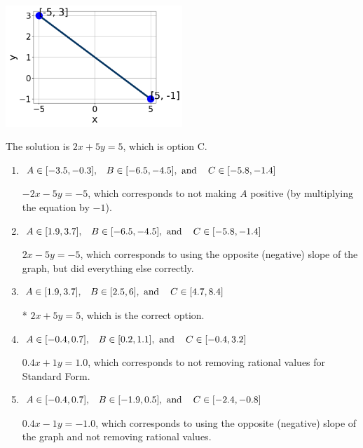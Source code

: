 \documentclass{extbook}[14pt]
\begin{document}
\begin{enumerate}
{\begin{center}
    \includegraphics[width=0.5\textwidth]{../Figures/linearGraphToStandardCopyC.png}
\end{center}


The solution is \( 2x + 5y = 5 \), which is option C.\begin{enumerate}[label=\Alph*.]
\item \( A \in [-3.5, -0.3], \hspace{3mm} B \in [-6.5, -4.5], \text{ and } \hspace{3mm} C \in [-5.8, -1.4] \)

 $-2x - 5y = -5$, which corresponds to not making $A$ positive (by multiplying the equation by $-1$).
\item \( A \in [1.9, 3.7], \hspace{3mm} B \in [-6.5, -4.5], \text{ and } \hspace{3mm} C \in [-5.8, -1.4] \)

 $2x - 5y = -5$, which corresponds to using the opposite (negative) slope of the graph, but did everything else correctly.
\item \( A \in [1.9, 3.7], \hspace{3mm} B \in [2.5, 6], \text{ and } \hspace{3mm} C \in [4.7, 8.4] \)

* $2x + 5y = 5$, which is the correct option.
\item \( A \in [-0.4, 0.7], \hspace{3mm} B \in [0.2, 1.1], \text{ and } \hspace{3mm} C \in [-0.4, 3.2] \)

 $0.4x + 1y = 1.0$, which corresponds to not removing rational values for Standard Form.
\item \( A \in [-0.4, 0.7], \hspace{3mm} B \in [-1.9, 0.5], \text{ and } \hspace{3mm} C \in [-2.4, -0.8] \)

 $0.4x - 1y = -1.0$, which corresponds to using the opposite (negative) slope of the graph and not removing rational values.
\end{enumerate}

}
\end{enumerate}
\end{document}
